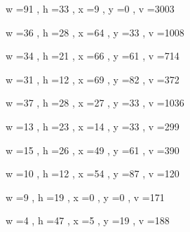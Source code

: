 \documentclass[11pt]{article}
\begin{document}
w =91 , h =33 , x =9 , y =0 , v =3003
\par
w =36 , h =28 , x =64 , y =33 , v =1008
\par
w =34 , h =21 , x =66 , y =61 , v =714
\par
w =31 , h =12 , x =69 , y =82 , v =372
\par
w =37 , h =28 , x =27 , y =33 , v =1036
\par
w =13 , h =23 , x =14 , y =33 , v =299
\par
w =15 , h =26 , x =49 , y =61 , v =390
\par
w =10 , h =12 , x =54 , y =87 , v =120
\par
w =9 , h =19 , x =0 , y =0 , v =171
\par
w =4 , h =47 , x =5 , y =19 , v =188
\par
\newpage
\end{document}
